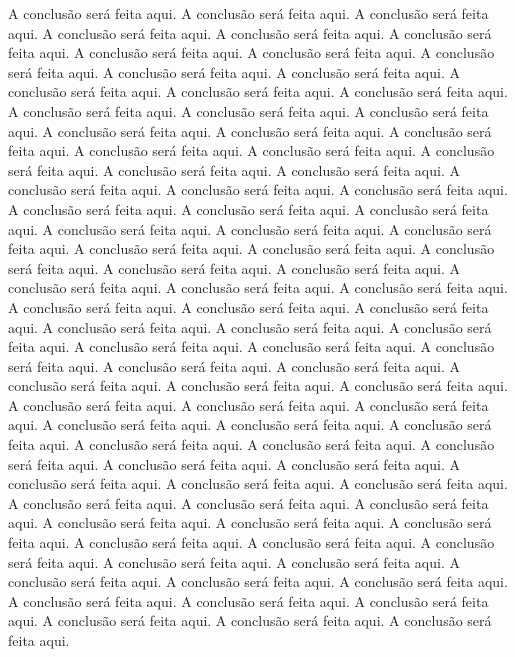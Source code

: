 A conclusão será feita aqui. A conclusão será feita aqui.
A conclusão será feita aqui. A conclusão será feita aqui.
A conclusão será feita aqui. A conclusão será feita aqui.
A conclusão será feita aqui. A conclusão será feita aqui.
A conclusão será feita aqui. A conclusão será feita aqui.
A conclusão será feita aqui. A conclusão será feita aqui.
A conclusão será feita aqui. A conclusão será feita aqui.
A conclusão será feita aqui. A conclusão será feita aqui.
A conclusão será feita aqui. A conclusão será feita aqui.
A conclusão será feita aqui. A conclusão será feita aqui.
A conclusão será feita aqui. A conclusão será feita aqui.
A conclusão será feita aqui. A conclusão será feita aqui.
A conclusão será feita aqui. A conclusão será feita aqui.
A conclusão será feita aqui. A conclusão será feita aqui.
A conclusão será feita aqui. A conclusão será feita aqui.
A conclusão será feita aqui. A conclusão será feita aqui.
A conclusão será feita aqui. A conclusão será feita aqui.
A conclusão será feita aqui. A conclusão será feita aqui.
A conclusão será feita aqui. A conclusão será feita aqui.
A conclusão será feita aqui. A conclusão será feita aqui.
A conclusão será feita aqui. A conclusão será feita aqui.
A conclusão será feita aqui. A conclusão será feita aqui.
A conclusão será feita aqui. A conclusão será feita aqui.
A conclusão será feita aqui. A conclusão será feita aqui.
A conclusão será feita aqui. A conclusão será feita aqui.
A conclusão será feita aqui. A conclusão será feita aqui.
A conclusão será feita aqui. A conclusão será feita aqui.
A conclusão será feita aqui. A conclusão será feita aqui.
A conclusão será feita aqui. A conclusão será feita aqui.
A conclusão será feita aqui. A conclusão será feita aqui.
A conclusão será feita aqui. A conclusão será feita aqui.
A conclusão será feita aqui. A conclusão será feita aqui.
A conclusão será feita aqui. A conclusão será feita aqui.
A conclusão será feita aqui. A conclusão será feita aqui.
A conclusão será feita aqui. A conclusão será feita aqui.
A conclusão será feita aqui. A conclusão será feita aqui.
A conclusão será feita aqui. A conclusão será feita aqui.
A conclusão será feita aqui. A conclusão será feita aqui.
A conclusão será feita aqui. A conclusão será feita aqui.
A conclusão será feita aqui. A conclusão será feita aqui.
A conclusão será feita aqui. A conclusão será feita aqui.
A conclusão será feita aqui. A conclusão será feita aqui.
A conclusão será feita aqui. A conclusão será feita aqui.
A conclusão será feita aqui. A conclusão será feita aqui.
A conclusão será feita aqui. A conclusão será feita aqui.

